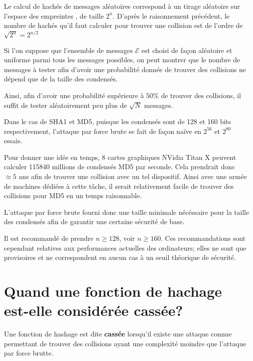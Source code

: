 \documentclass[10.5pt, a4paper, twoside, openright]{report}
\begin{document}
Le calcul de hachés de messages aléatoires correspond à un tirage aléatoire sur l’espace des empreintes , de taille $2^n$. D’après le raisonnement précédent, le nombre de hachés qu’il faut calculer pour trouver une collision est de l’ordre de $\sqrt{2^n} = 2^{n/2}$

Si l'on suppose que l'ensemble de messages $\mathcal{E}$ est choisi de façon aléatoire et uniforme parmi tous les messages possibles, on peut montrer que le nombre de messages à tester afin d'avoir une probabilité donnée de trouver des collisions ne dépend que de la taille des condensés.

Ainsi, afin d'avoir une probabilité supérieure à $50\%$ de trouver des collisions, il suffit de tester aléatoirement peu plus de $\sqrt{N}$ messages.

Dans le cas de SHA1 et MD5, puisque les condensés sont de 128 et 160 bits respectivement, l'attaque par force brute se fait de façon naïve en $2^56$ et $2^80$ essais.

Pour donner une idée en temps, 8 cartes graphiques NVidia Titan X peuvent calculer 115840 millions de condensés MD5 par seconde. Cela prendrait donc $ \approx 5 \mbox{ ans}$ afin de trouver une collision avec un tel dispositif.
Ainsi avec une armée de machines dédiées à cette tâche, il serait relativement facile de trouver des collisions pour MD5 en un temps raisonnable.

L'attaque par force brute fourni donc une taille minimale nécéssaire pour la taille des condensés afin de garantir une certaine sécurité de base.

Il est recommandé de prendre $n \ge 128$, voir $n\ge 160$. Ces recommandations sont cependant relatives aux performances actuelles des ordinateurs; elles ne sont que provisoires et ne correspondent en aucun cas à un seuil théorique de sécurité.

\section{Quand une fonction de hachage est-elle considérée cassée?}
Une fonction de hashage est dite \textbf{cassée} lorsqu'il existe une attaque connue permettant de trouver des collisions ayant une complexité moindre que l'attaque par force brutte. 
\end{document}
